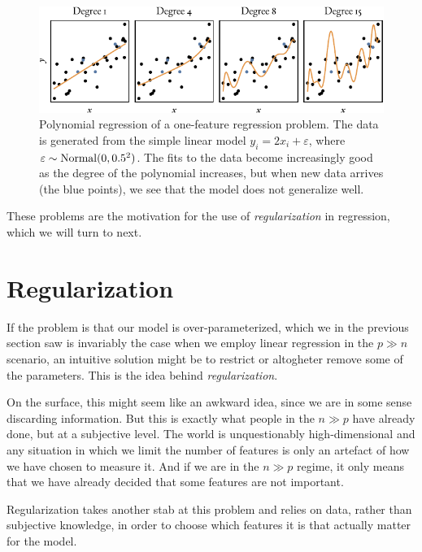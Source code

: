 \begin{figure}
  \centering
  \includegraphics[]{figures/polyfit.pdf}
  \caption{%
    Polynomial regression of a one-feature regression problem.
    The data is generated from the simple linear model \(y_i = 2x_i + \varepsilon\),
    where \(\varepsilon \sim \operatorname{Normal}(0, 0.5^2)\).
    The fits to the data become increasingly good as the degree of the polynomial increases, but when new data arrives (the blue points), we see that the model does not generalize well.
  }
  \label{fig:polyfit}
\end{figure}

These problems are the motivation for the use of \emph{regularization} in regression, which we will turn to next.

\section{Regularization}

If the problem is that our model is over-parameterized, which we in the previous section saw is invariably the case when we employ linear regression in the \(p \gg n\) scenario, an intuitive solution might be to restrict or altogheter remove some of the parameters. This is the idea behind \emph{regularization}.

On the surface, this might seem like an awkward idea, since we are in some sense discarding information. But this is exactly what people in the \(n \gg p\) have already done, but at a subjective level. The world is unquestionably high-dimensional and any situation in which we limit the number of features is only an artefact of how we have chosen to measure it. And if we are in the \(n \gg p\) regime, it only means that we have already decided that some features are not important.

Regularization takes another stab at this problem and relies on data, rather than subjective knowledge, in order to choose which features it is that actually matter for the model.

